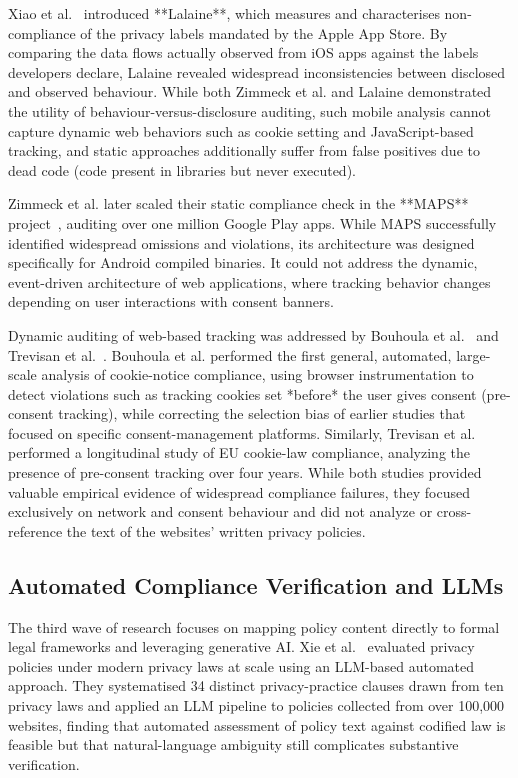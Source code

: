 \documentclass[11pt,a4paper]{article}
\begin{document}
Xiao et al.~\cite{xiao-2023-lalaine} introduced **Lalaine**, which measures and characterises non-compliance of the privacy labels mandated by the Apple App Store. By comparing the data flows actually observed from iOS apps against the labels developers declare, Lalaine revealed widespread inconsistencies between disclosed and observed behaviour. While both Zimmeck et al. and Lalaine demonstrated the utility of behaviour-versus-disclosure auditing, such mobile analysis cannot capture dynamic web behaviors such as cookie setting and JavaScript-based tracking, and static approaches additionally suffer from false positives due to dead code (code present in libraries but never executed).

Zimmeck et al. later scaled their static compliance check in the **MAPS** project~\cite{zimmeck-2019-maps}, auditing over one million Google Play apps. While MAPS successfully identified widespread omissions and violations, its architecture was designed specifically for Android compiled binaries. It could not address the dynamic, event-driven architecture of web applications, where tracking behavior changes depending on user interactions with consent banners.

Dynamic auditing of web-based tracking was addressed by Bouhoula et al.~\cite{bouhoula-2024-cookies} and Trevisan et al.~\cite{trevisan-2019-cookielaw}. Bouhoula et al. performed the first general, automated, large-scale analysis of cookie-notice compliance, using browser instrumentation to detect violations such as tracking cookies set *before* the user gives consent (pre-consent tracking), while correcting the selection bias of earlier studies that focused on specific consent-management platforms. Similarly, Trevisan et al. performed a longitudinal study of EU cookie-law compliance, analyzing the presence of pre-consent tracking over four years. While both studies provided valuable empirical evidence of widespread compliance failures, they focused exclusively on network and consent behaviour and did not analyze or cross-reference the text of the websites' written privacy policies.

\subsection{Automated Compliance Verification and LLMs}
The third wave of research focuses on mapping policy content directly to formal legal frameworks and leveraging generative AI. Xie et al.~\cite{xie-2025-llmpolicy} evaluated privacy policies under modern privacy laws at scale using an LLM-based automated approach. They systematised 34 distinct privacy-practice clauses drawn from ten privacy laws and applied an LLM pipeline to policies collected from over 100,000 websites, finding that automated assessment of policy text against codified law is feasible but that natural-language ambiguity still complicates substantive verification.
\end{document}
